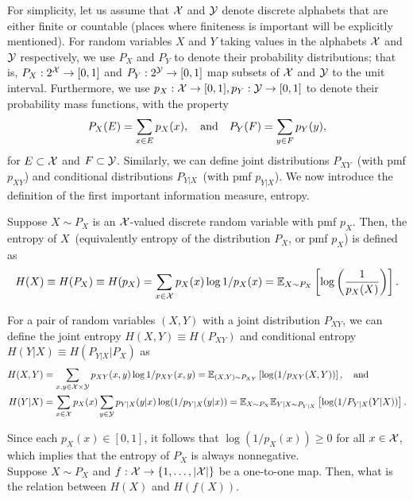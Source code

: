 \documentclass[12pt]{article}
\begin{document}
For simplicity, let us assume that ${\cal X}$ and ${\cal Y}$ denote discrete alphabets that are either finite or countable (places where finiteness is important will be explicitly mentioned). For random variables $X$ and $Y$ taking values in the alphabets ${\cal X}$ and ${\cal Y}$ respectively, we  use $P_X$ and $P_Y$ to denote their probability distributions; that is, $P_X: 2^{{\cal X}} \to [0,1]$ and $P_Y:2^{{\cal Y}} \to [0,1]$ map subsets of ${\cal X}$ and ${\cal Y}$ to the unit interval. Furthermore, we use $p_X:{\cal X} \to [0,1], p_Y:{\cal Y} \to [0,1]$ to denote their probability mass functions, with the property 
\begin{align}
P_X(E) = \sum_{x \in E} p_X(x), \quad \text{and} \quad P_Y(F) = \sum_{y \in F} p_Y(y), 
\end{align}
for $E \subset {\cal X}$ and $F \subset {\cal Y}$. Similarly, we can define joint distributions $P_{XY}$~(with pmf $p_{XY}$) and conditional distributions $P_{Y|X}$~(with pmf $p_{Y|X}$). 
We now introduce the definition of the first important information measure, entropy. 
\begin{definition}[Entropy]
\label{def:entropy-discrete} Suppose $X \sim P_X$ is an ${\cal X}$-valued discrete random variable with pmf $p_X$. Then, the entropy of $X$~(equivalently entropy of the distribution $P_X$, or pmf $p_X$) is defined as 
\begin{align}
H(X) \equiv H(P_X) \equiv H(p_X) = \sum_{x \in {\cal X}} p_X(x) \log 1/p_X(x) = \mathbb{E}_{X \sim P_X}\left[ \log \left( \frac{1}{p_X(X)} \right) \right]. 
\end{align}

For a pair of random variables $(X, Y)$ with a joint distribution $P_{XY}$, we can define the joint entropy $H(X, Y) \equiv H(P_{XY})$ and conditional entropy $H(Y|X) \equiv H(P_{Y|X}|P_X)$ as 
\begin{align}
H(X, Y) &= \sum_{x, y\in {\cal X} \times {\cal Y}} p_{XY}(x, y) \log 1/p_{XY}(x,y) = \mathbb{E}_{(X, Y) \sim P_{XY}} \left[ \log(1/p_{XY}(X, Y)) \right],  \quad \text{and}\\ 
  H(Y|X) &= \sum_{x \in {\cal X}} p_X(x) \sum_{y \in {\cal Y}} p_{Y|X}(y|x) \log (1/p_{Y|X}(y|x)) =  \mathbb{E}_{X \sim P_X} \mathbb{E}_{Y|X \sim P_{Y|X}} \left[ \log(1/P_{Y|X}(Y|X)) \right]. 
\end{align}
\end{definition}
Since each $p_X(x) \in [0,1]$, it follows that $\log(1/p_X(x)) \geq 0$ for all $x \in {\cal X}$, which implies that the entropy of $P_X$ is always nonnegative.\\
 Suppose $X \sim P_X$ and $f:{\cal X} \to \{1, \ldots, |{\cal X}|\}$ be a one-to-one map. Then, what is the relation between $H(X)$ and $H(f(X))$. 
\end{document}
